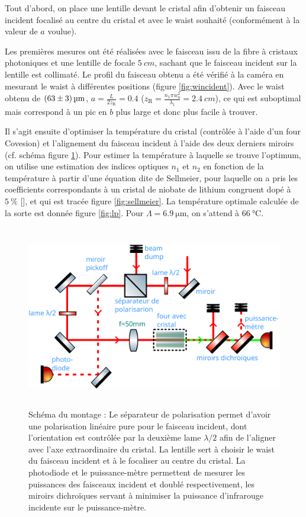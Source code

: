 \documentclass[11pt,a4paper]{article}
\newcommand{\ncite}[1]{[\citenum{#1}]}
\newcommand{\zr}{z_\mathsc{R}}
\newcommand{\mathsc}[1]{\mathrm{\scriptscriptstyle {#1}}}
\begin{document}
Tout d'abord, on place une lentille devant le cristal afin d'obtenir un faisceau incident focalisé au centre du cristal et avec le waist souhaité (conformément à la valeur de $a$ voulue).

Les premières mesures ont été réalisées avec le faisceau issu de la fibre à cristaux photoniques et une lentille de focale $\SI{5}{cm}$, sachant que le faisceau incident sur la lentille est collimaté. Le profil du faisceau obtenu a été vérifié à la caméra en mesurant le waist à différentes positions (figure \ref{fig:wincident}). Avec le waist obtenu de $\SI{63\pm 3}{\micro\meter}$, $a=\frac{L}{2\zr}=0.4$ ($\zr = \frac{n_1 \pi w_0^2}{\lambda_1} = \SI{2.4}{cm}$), 
 ce qui est suboptimal mais correspond à un pic en $b$ plus large et donc plus facile à trouver.

 Il s'agit ensuite d'optimiser la température du cristal (contrôlée à l'aide d'un four Covesion) et l'alignement du faisceau incident à l'aide des deux derniers miroirs (cf. schéma figure \ref{fig:montage}). Pour estimer la température à laquelle se trouve l'optimum, on utilise une estimation des indices optiques $n_1$ et $n_2$ en fonction de la température à partir d'une équation dite de Sellmeier, pour laquelle on a pris les coefficients correspondants à un cristal de niobate de lithium congruent dopé à $\SI{5}{\percent}$ \ncite{gayer,covesion}, et qui est tracée figure \ref{fig:sellmeier}. La température optimale calculée de la sorte est donnée figure \ref{fig:lp}. Pour $\Lambda = \SI{6.9}{\micro\meter}$, on s'attend à $\SI{66}{\celsius}$.

\begin{figure}[h]
	\centering
	\includegraphics[height=8cm]{./img/schema.pdf}
	\caption{Schéma du montage : \small Le séparateur de polarisation permet d'avoir une polarisation linéaire pure pour le faisceau incident, dont l'orientation est contrôlée par la deuxième lame $\lambda / 2$ afin de l'aligner avec l'axe extraordinaire du cristal. La lentille sert à choisir le waist du faisceau incident et à le focaliser au centre du cristal. La photodiode et le puissance-mètre permettent de mesurer les puissances des faisceaux incident et doublé respectivement, les miroirs dichroïques servant à minimiser la puissance d'infrarouge incidente sur le puissance-mètre.} %
\label{fig:montage}
\end{figure}
\end{document}
